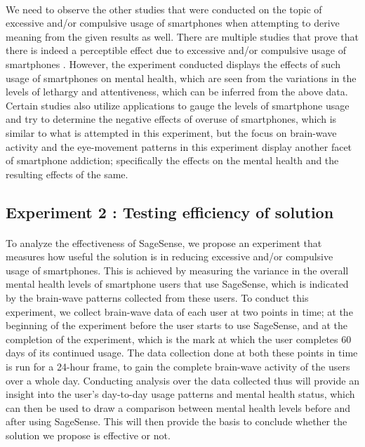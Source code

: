 \documentclass{article}
\begin{document}
\paragraph{} We need to observe the other studies that were conducted on the topic of excessive and/or compulsive usage of smartphones when attempting to derive meaning from the given results as well. There are multiple studies that prove that there is indeed a perceptible effect due to excessive and/or compulsive usage of smartphones \cite{haug2015smartphone, samaha2016relationships, mok2014latent}. However, the experiment conducted displays the effects of such usage of smartphones on mental health, which are seen from the variations in the levels of lethargy and attentiveness, which can be inferred from the above data. Certain studies also utilize applications to gauge the levels of smartphone usage and try to determine the negative effects of overuse of smartphones\cite{lin2015time, lin2017incorporation}, which is similar to what is attempted in this experiment, but the focus on brain-wave activity and the eye-movement patterns in this experiment display another facet of smartphone addiction; specifically the effects on the mental health and the resulting effects of the same.


\subsection{Experiment 2 : Testing efficiency of solution}

\paragraph{} To analyze the effectiveness of SageSense, we propose an experiment that measures how useful the solution is in reducing excessive and/or compulsive usage of smartphones. This is achieved by measuring the variance in the overall mental health levels of smartphone users that use SageSense, which is indicated by the brain-wave patterns collected from these users. To conduct this experiment, we collect brain-wave data of each user at two points in time; at the beginning of the experiment before the user starts to use SageSense, and at the completion of the experiment, which is the mark at which the user completes 60 days of its continued usage. The data collection done at both these points in time is run for a 24-hour frame, to gain the complete brain-wave activity of the users over a whole day. Conducting analysis over the data collected thus will provide an insight into the user's day-to-day usage patterns and mental health status, which can then be used to draw a comparison between mental health levels before and after using SageSense. This will then provide the basis to conclude whether the solution we propose is effective or not.
\end{document}
